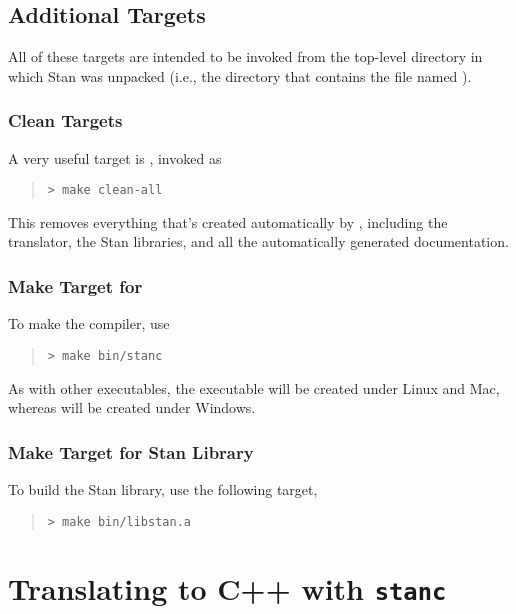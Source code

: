\subsection{Additional   Targets}

All of these targets are intended to be invoked from the top-level
directory in which Stan was unpacked (i.e., the directory that
contains the file named ).

\subsubsection{Clean Targets}

A very useful target is , invoked as
%
\begin{quote}
\begin{Verbatim}[fontshape=sl]
> make clean-all
\end{Verbatim}
\end{quote}
%
This removes everything that's created automatically by ,
including the  translator, the Stan libraries, and all the
automatically generated documentation.  

\subsubsection{Make Target for }

To make the  compiler, use
%
\begin{quote}
\begin{Verbatim}[fontshape=sl]
> make bin/stanc
\end{Verbatim}
\end{quote}
%
As with other executables, the executable  will be
created under Linux and Mac, whereas  will be
created under Windows.

\subsubsection{Make Target for Stan Library}

To build the Stan library, use the following target,
%
\begin{quote}
\begin{Verbatim}[fontshape=sl]
> make bin/libstan.a
\end{Verbatim}
\end{quote}



\section{Translating \Stan to C++ with {\tt\bfseries stanc}}\label{stanc.section}


